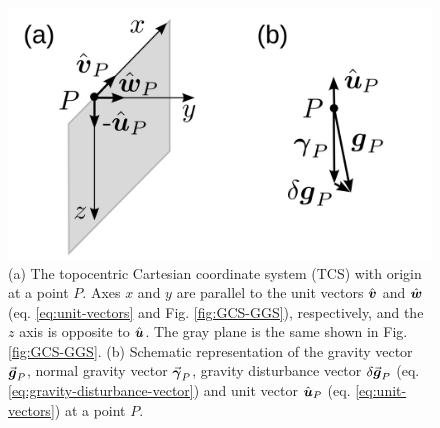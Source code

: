 \documentclass[extra]{gji}
\newcommand{\versor}[1]{\hat{\mitbf{#1}}}
\renewcommand{\vector}[1]{\vec{\mitbf{#1}}}
\begin{document}
\begin{figure}
    \includegraphics{figures/local-system.png}
    \caption{
    (a) The topocentric Cartesian coordinate system (TCS) with origin at a
    point $P$.
    Axes $x$ and $y$ are parallel to the unit vectors $\versor{v}$ and
    $\versor{w}$ (eq. \ref{eq:unit-vectors} and Fig. \ref{fig:GCS-GGS}),
    respectively, and the $z$ axis is opposite to $\versor{u}$.
    The gray plane is the same shown in Fig. \ref{fig:GCS-GGS}.
    (b) Schematic representation of the gravity vector
    $\vector{g}_{P}$, normal gravity vector $\vector{\gamma}_{P}$,
    gravity disturbance vector $\delta \vector{g}_{P}$
    (eq. \ref{eq:gravity-disturbance-vector}) and unit vector
    $\versor{u}_{P}$ (eq. \ref{eq:unit-vectors}) at a point
    $P$.
    }
  \label{fig:TCS}
\end{figure}
\end{document}
